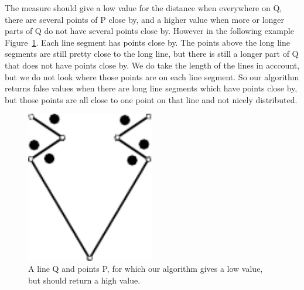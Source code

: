 \documentclass[a4paper,11pt]{article}
\begin{document}
The measure should give a low value for the distance when everywhere on Q, there are several points of P close by, and a higher value when more or longer parts of Q do not have several points close by.
However in the following example Figure~\ref{fig:example1}. Each line segment has points close by. 
The points above the long line segments are still pretty close to the long line, but there is still a longer part of Q that does not have points close by. 
We do take the length of the lines in acccount, but we do not look where those points are on each line segment. 
So our algorithm returns false values when there are long line segments which have points close by, but those points are all close to one point on that line and not nicely distributed. 
\begin{figure}[H]
	\centering
	\includegraphics[width=0.5\textwidth]{img/example1.pdf}
	\caption{A line Q and points P, for which our algorithm gives a low value, but should return a high value.}
	\label{fig:example1}
\end{figure}
\end{document}
